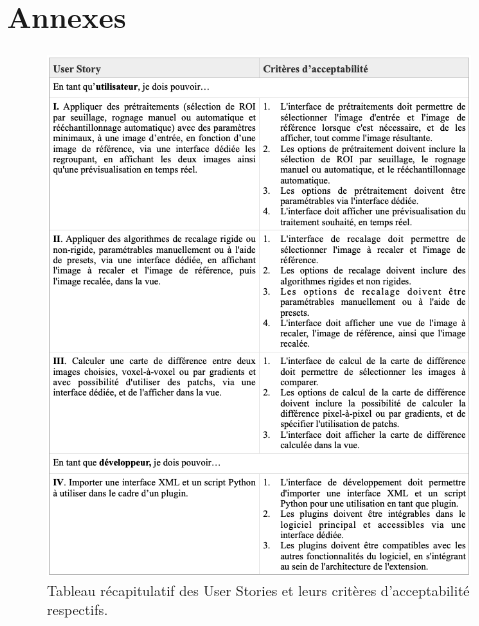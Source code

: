 \documentclass{article}
\begin{document}
{
    

    \newpage
}

{
    \section{Annexes}
    \label{sec:annexes}

    \begin{figure}[!ht]
        \centering
        \includegraphics[height=0.7\textheight]{images/us-recap.png}
        \caption{Tableau récapitulatif des User Stories et leurs critères d'acceptabilité respectifs.}
        \label{fig:us-recap}
    \end{figure}
}
\end{document}
